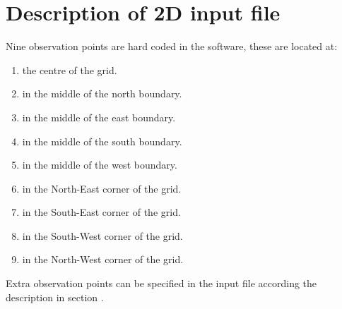 \documentclass[subfooter, backcover]{mooiman_memo}
\begin{document}
\chapter{Description of 2D input file}
Nine observation points are hard coded in the software, these are located at:
\begin{enumerate}
    \item the centre of the grid.
    \item in the middle of the north boundary.
    \item in the middle of the east boundary.
    \item in the middle of the south boundary.
    \item in the middle of the west boundary.
    \item in the North-East corner of the grid.
    \item in the South-East corner of the grid.
    \item in the South-West corner of the grid.
    \item in the North-West corner of the grid.
\end{enumerate}
Extra observation points can be specified in the input file according the description in section .

\end{document}
